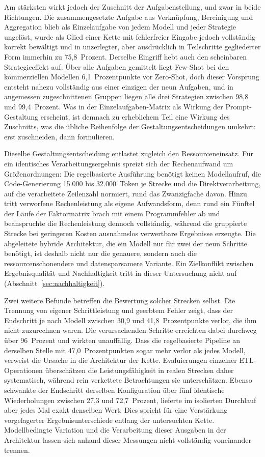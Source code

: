 Am stärksten wirkt jedoch der Zuschnitt der Aufgabenstellung, und zwar in beide Richtungen. Die zusammengesetzte Aufgabe aus Verknüpfung, Bereinigung und Aggregation blieb als Einzelaufgabe von jedem Modell und jeder Strategie ungelöst, wurde als Glied einer Kette mit fehlerfreier Eingabe jedoch vollständig korrekt bewältigt und in unzerlegter, aber ausdrücklich in Teilschritte gegliederter Form immerhin zu 75,8~Prozent. Derselbe Eingriff hebt auch den scheinbaren Strategieeffekt auf: Über alle Aufgaben gemittelt liegt Few-Shot bei den kommerziellen Modellen 6,1~Prozentpunkte vor Zero-Shot, doch dieser Vorsprung entsteht nahezu vollständig aus einer einzigen der neun Aufgaben, und in angemessen zugeschnittenen Gruppen liegen alle drei Strategien zwischen 98,8 und 99,4~Prozent. Was in der Einzelaufgaben-Matrix als Wirkung der Prompt-Gestaltung erscheint, ist demnach zu erheblichem Teil eine Wirkung des Zuschnitts, was die übliche Reihenfolge der Gestaltungsentscheidungen umkehrt: erst zuschneiden, dann formulieren.

Dieselbe Gestaltungsentscheidung entlastet zugleich den Ressourceneinsatz. Für ein identisches Verarbeitungsergebnis spreizt sich der Rechenaufwand um Größenordnungen: Die regelbasierte Ausführung benötigt keinen Modellaufruf, die Code-Generierung 15.000 bis 32.000~Token je Strecke und die Direktverarbeitung, auf die verarbeitete Zeilenzahl normiert, rund das Zwanzigfache davon. Hinzu tritt verworfene Rechenleistung als eigene Aufwandsform, denn rund ein Fünftel der Läufe der Faktormatrix brach mit einem Programmfehler ab und beanspruchte die Rechenleistung dennoch vollständig, während die gruppierte Strecke bei geringeren Kosten ausnahmslos verwertbare Ergebnisse erzeugte. Die abgeleitete hybride Architektur, die ein Modell nur für zwei der neun Schritte benötigt, ist deshalb nicht nur die genauere, sondern auch die ressourcenschonendere und datensparsamere Variante. Ein Zielkonflikt zwischen Ergebnisqualität und Nachhaltigkeit tritt in dieser Untersuchung nicht auf (Abschnitt~\ref{sec:nachhaltigkeit}).

Zwei weitere Befunde betreffen die Bewertung solcher Strecken selbst. Die Trennung von eigener Schrittleistung und geerbtem Fehler zeigt, dass der Endschritt je nach Modell zwischen 30,9 und 41,8~Prozentpunkte verlor, die ihm nicht zuzurechnen waren. Die verursachenden Schritte erreichten dabei durchweg über 96~Prozent und wirkten unauffällig. Dass die regelbasierte Pipeline an derselben Stelle mit 47,0~Prozentpunkten sogar mehr verlor als jedes Modell, verweist die Ursache in die Architektur der Kette. Evaluierungen einzelner \ac{ETL}-Operationen überschätzen die Leistungsfähigkeit in realen Strecken daher systematisch, während rein verkettete Betrachtungen sie unterschätzen. Ebenso schwankte der Endschritt derselben Konfiguration über fünf identische Wiederholungen zwischen 27,3 und 72,7~Prozent, lieferte im isolierten Durchlauf aber jedes Mal exakt denselben Wert: Dies spricht für eine Verstärkung vorgelagerter Ergebnisunterschiede entlang der untersuchten Kette. Modellbedingte Variation und die Verarbeitung dieser Ausgaben in der Architektur lassen sich anhand dieser Messungen nicht vollständig voneinander trennen.

